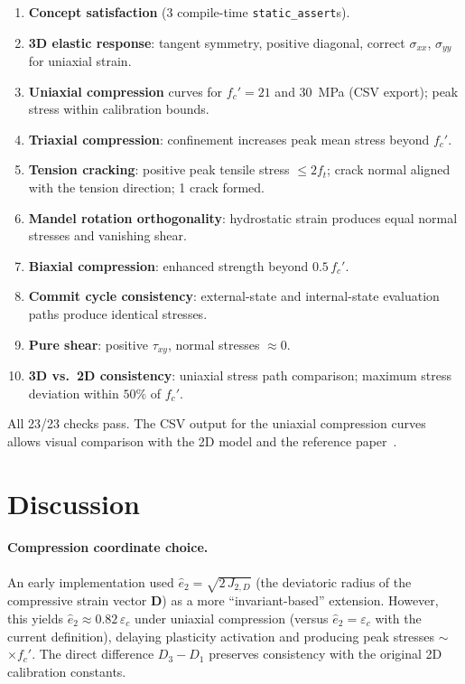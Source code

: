 \begin{enumerate}
  \item \textbf{Concept satisfaction} (3 compile-time \texttt{static\_assert}s).
  \item \textbf{3D elastic response}: tangent symmetry, positive diagonal,
        correct $\sigma_{xx}$, $\sigma_{yy}$ for uniaxial strain.
  \item \textbf{Uniaxial compression} curves for $f_c' = 21$ and $30$~MPa
        (CSV export); peak stress within calibration bounds.
  \item \textbf{Triaxial compression}: confinement increases peak mean stress
        beyond $f_c'$.
  \item \textbf{Tension cracking}: positive peak tensile stress $\le 2f_t$;
        crack normal aligned with the tension direction; 1 crack formed.
  \item \textbf{Mandel rotation orthogonality}: hydrostatic strain produces
        equal normal stresses and vanishing shear.
  \item \textbf{Biaxial compression}: enhanced strength beyond $0.5\,f_c'$.
  \item \textbf{Commit cycle consistency}: external-state and internal-state
        evaluation paths produce identical stresses.
  \item \textbf{Pure shear}: positive $\tau_{xy}$, normal stresses $\approx 0$.
  \item \textbf{3D vs.\ 2D consistency}: uniaxial stress path comparison; maximum
        stress deviation within $50\%$ of $f_c'$.
\end{enumerate}

All 23/23 checks pass.  The CSV output for the uniaxial compression curves
allows visual comparison with the 2D model and the reference
paper~\cite{KoBathe2026}.


\section{Discussion}
\label{sec:kb3d-discussion}

\paragraph{Compression coordinate choice.}
An early implementation used $\hat{e}_2 = \sqrt{2\,J_{2,D}}$ (the deviatoric
radius of the compressive strain vector $\mathbf{D}$) as a more
``invariant-based'' extension.  However, this yields
$\hat{e}_2 \approx 0.82\,\varepsilon_c$ under uniaxial compression (versus
$\hat{e}_2 = \varepsilon_c$ with the current definition), delaying plasticity
activation and producing peak stresses $\sim$$\times f_c'$.  The direct
difference $D_3 - D_1$ preserves consistency with the original 2D calibration
constants.

